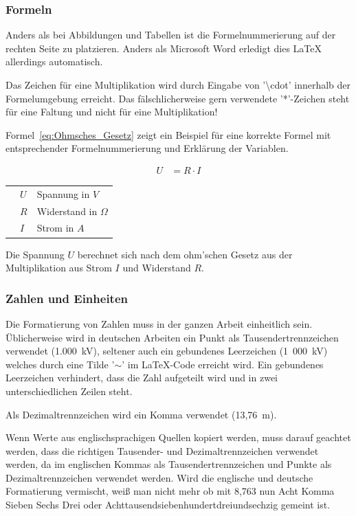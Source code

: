 \subsubsection{Formeln}

Anders als bei Abbildungen und Tabellen ist die Formelnummerierung auf der rechten Seite zu platzieren. Anders als Microsoft Word erledigt dies LaTeX allerdings automatisch.

Das Zeichen für eine Multiplikation wird durch Eingabe von '\textbackslash cdot' innerhalb der Formelumgebung erreicht. Das fälschlicherweise gern verwendete '*'-Zeichen steht für eine Faltung und nicht für eine Multiplikation!

Formel~\ref{eq:Ohmsches_Gesetz} zeigt ein Beispiel für eine korrekte Formel mit entsprechender Formelnummerierung und Erklärung der Variablen.

\begin{align}
	\label{eq:Ohmsches_Gesetz}
	U &= R \cdot I
\end{align}
\vspace*{-1cm}
\begin{table}[H]
	\begin{tabular}{@{}p{1cm}@{}p{1cm}<{\dotfill}@{}p{\dimexpr\linewidth-5cm}}
		& $U$ & Spannung in $V$  \\
		& $R$ & Widerstand in $\Omega$ \\
		& $I$ & Strom in $A$ 
	\end{tabular}
\end{table}

Die Spannung $U$ berechnet sich nach dem ohm'schen Gesetz aus der Multiplikation aus Strom $I$ und Widerstand $R$.


\subsubsection{Zahlen und Einheiten}

Die Formatierung von Zahlen muss in der ganzen Arbeit einheitlich sein. 
Üblicherweise wird in deutschen Arbeiten ein Punkt als Tausendertrennzeichen verwendet (1.000~kV), seltener auch ein gebundenes Leerzeichen (1~000~kV) welches durch eine Tilde '$\sim$' im LaTeX-Code erreicht wird. Ein gebundenes Leerzeichen verhindert, dass die Zahl aufgeteilt wird und in zwei unterschiedlichen Zeilen steht.

Als Dezimaltrennzeichen wird ein Komma verwendet (13,76~m).

Wenn Werte aus englischsprachigen Quellen kopiert werden, muss darauf geachtet werden, dass die richtigen Tausender- und Dezimaltrennzeichen verwendet werden, da im englischen Kommas als Tausendertrennzeichen und Punkte als Dezimaltrennzeichen verwendet werden. Wird die englische und deutsche Formatierung vermischt, weiß man nicht mehr ob mit 8,763 nun {\glqq}Acht Komma Sieben Sechs Drei{\grqq} oder {\glqq}Achttausendsiebenhundertdreiundsechzig{\grqq} gemeint ist.

